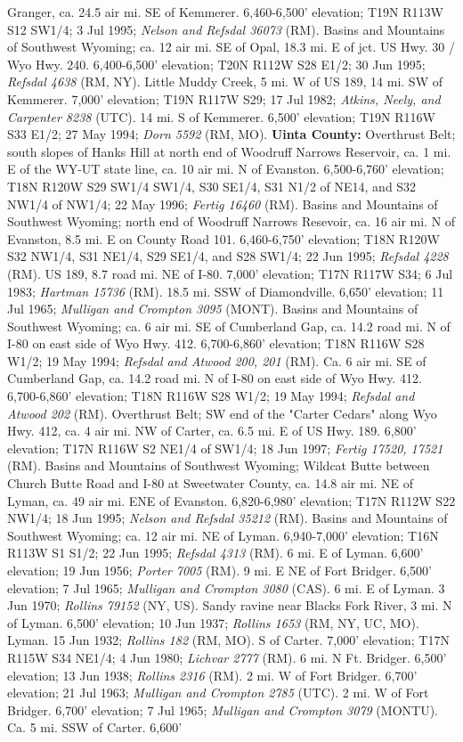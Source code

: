 Granger, ca. 24.5 air mi. SE of Kemmerer. 6,460-6,500' elevation; T19N R113W S12 SW1/4; 3 Jul 1995; \textit{Nelson and Refsdal 36073} (RM).  Basins and Mountains of Southwest Wyoming; ca. 12 air mi. SE of Opal, 18.3 mi. E of jct. US Hwy. 30 / Wyo Hwy. 240. 6,400-6,500' elevation; T20N R112W S28 E1/2; 30 Jun 1995; \textit{Refsdal 4638} (RM, NY).  Little Muddy Creek, 5 mi. W of US 189, 14 mi. SW of Kemmerer. 7,000' elevation; T19N R117W S29; 17 Jul 1982; \textit{Atkins, Neely, and Carpenter 8238} (UTC).  14 mi. S of Kemmerer. 6,500' elevation; T19N R116W S33 E1/2; 27 May 1994; \textit{Dorn 5592} (RM, MO).  \textbf{Uinta County:} Overthrust Belt; south slopes of Hanks Hill at north end of Woodruff Narrows Reservoir, ca. 1 mi. E of the WY-UT state line, ca. 10 air mi. N of Evanston. 6,500-6,760' elevation; T18N R120W S29 SW1/4 SW1/4, S30 SE1/4, S31 N1/2 of NE14, and S32 NW1/4 of NW1/4; 22 May 1996; \textit{Fertig 16460} (RM).  Basins and Mountains of Southwest Wyoming; north end of Woodruff Narrows Resevoir, ca. 16 air mi. N of Evanston, 8.5 mi. E on County Road 101. 6,460-6,750' elevation; T18N R120W S32 NW1/4, S31 NE1/4, S29 SE1/4, and S28 SW1/4; 22 Jun 1995; \textit{Refsdal 4228} (RM).  US 189, 8.7 road mi. NE of I-80. 7,000' elevation; T17N R117W S34; 6 Jul 1983; \textit{Hartman 15736} (RM).  18.5 mi. SSW of Diamondville. 6,650’ elevation; 11 Jul 1965; \textit{Mulligan and Crompton 3095} (MONT).  Basins and Mountains of Southwest Wyoming; ca. 6 air mi. SE of Cumberland Gap, ca. 14.2 road mi. N of I-80 on east side of Wyo Hwy. 412. 6,700-6,860' elevation; T18N R116W S28 W1/2; 19 May 1994; \textit{Refsdal and Atwood 200, 201} (RM).  Ca. 6 air mi. SE of Cumberland Gap, ca. 14.2 road mi. N of I-80 on east side of Wyo Hwy. 412. 6,700-6,860' elevation; T18N R116W S28 W1/2; 19 May 1994; \textit{Refsdal and Atwood 202} (RM).  Overthrust Belt; SW end of the "Carter Cedars" along Wyo Hwy. 412, ca. 4 air mi. NW of Carter, ca. 6.5 mi. E of US Hwy. 189. 6,800' elevation; T17N R116W S2 NE1/4 of SW1/4; 18 Jun 1997; \textit{Fertig 17520, 17521} (RM).  Basins and Mountains of Southwest Wyoming; Wildcat Butte between Church Butte Road and I-80 at Sweetwater County, ca. 14.8 air mi. NE of Lyman, ca. 49 air mi. ENE of Evanston.  6,820-6,980' elevation; T17N R112W S22 NW1/4; 18 Jun 1995; \textit{Nelson and Refsdal 35212} (RM).  Basins and Mountains of Southwest Wyoming; ca. 12 air mi. NE of Lyman. 6,940-7,000' elevation; T16N R113W S1 S1/2; 22 Jun 1995; \textit{Refsdal 4313} (RM).  6 mi. E of Lyman. 6,600’ elevation; 19 Jun 1956; \textit{Porter 7005} (RM).  9 mi. E NE of Fort Bridger. 6,500’ elevation; 7 Jul 1965; \textit{Mulligan and Crompton 3080} (CAS).  6 mi. E of Lyman. 3 Jun 1970; \textit{Rollins 79152} (NY, US).  Sandy ravine near Blacks Fork River, 3 mi. N of Lyman.	6,500' elevation; 10 Jun 1937; \textit{Rollins 1653} (RM, NY, UC, MO).  Lyman. 15 Jun 1932; \textit{Rollins 182} (RM, MO).  S of Carter. 7,000' elevation; T17N R115W S34 NE1/4; 4 Jun 1980; \textit{Lichvar 2777} (RM).  6 mi. N Ft. Bridger. 6,500' elevation; 13 Jun 1938; \textit{Rollins 2316} (RM).  2 mi. W of Fort Bridger. 6,700’ elevation; 21 Jul 1963; \textit{Mulligan and Crompton 2785} (UTC).  2 mi. W of Fort Bridger. 6,700’ elevation; 7 Jul 1965; \textit{Mulligan and Crompton 3079} (MONTU).  Ca. 5 mi. SSW of Carter. 6,600' 